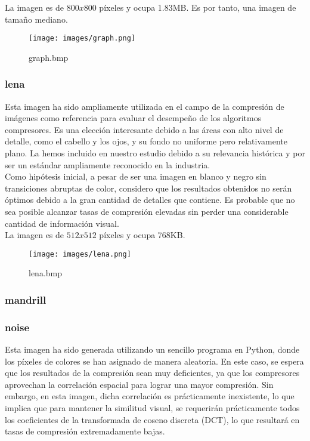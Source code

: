 \documentclass[12pt,a4paper]{article}
\begin{document}
La imagen es de $800x800$ píxeles y ocupa 1.83MB. Es por tanto, una imagen de tamaño mediano.\\

\begin{figure}[H]
    \centering
    \texttt{[image: images/graph.png]}
    \caption{graph.bmp}
    
\end{figure}

\subsubsection{lena}
Esta imagen ha sido ampliamente utilizada en el campo de la compresión de imágenes como referencia para evaluar el desempeño de los algoritmos compresores. Es una elección interesante debido a las áreas con alto nivel de detalle, como el cabello y los ojos, y su fondo no uniforme pero relativamente plano. La hemos incluido en nuestro estudio debido a su relevancia histórica y por ser un estándar ampliamente reconocido en la industria.\\

Como hipótesis inicial, a pesar de ser una imagen en blanco y negro sin transiciones abruptas de color, considero que los resultados obtenidos no serán óptimos debido a la gran cantidad de detalles que contiene. Es probable que no sea posible alcanzar tasas de compresión elevadas sin perder una considerable cantidad de información visual.\\

La imagen es de $512x512$ píxeles y ocupa 768KB.\\

\begin{figure}[H]
    \centering
    \texttt{[image: images/lena.png]}
    \caption{lena.bmp}
    
\end{figure}

\subsubsection{mandrill}

\subsubsection{noise} \label{noisepre}
Esta imagen ha sido generada utilizando un sencillo programa en Python, donde los píxeles de colores se han asignado de manera aleatoria. En este caso, se espera que los resultados de la compresión sean muy deficientes, ya que los compresores aprovechan la correlación espacial para lograr una mayor compresión. Sin embargo, en esta imagen, dicha correlación es prácticamente inexistente, lo que implica que para mantener la similitud visual, se requerirán prácticamente todos los coeficientes de la transformada de coseno discreta (DCT), lo que resultará en tasas de compresión extremadamente bajas.\\
\end{document}

